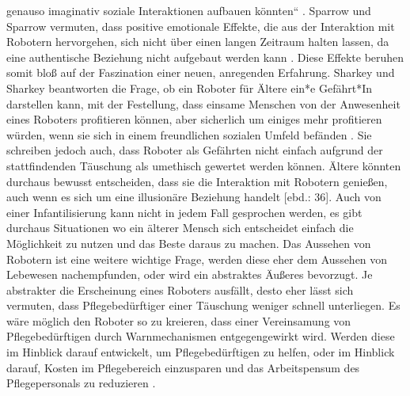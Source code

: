 genauso imaginativ soziale Interaktionen aufbauen könnten“ \cite[59]{haker}. Sparrow und Sparrow vermuten, dass positive emotionale Effekte, die aus der Interaktion mit Robotern hervorgehen, sich nicht über einen langen Zeitraum halten lassen, da eine authentische Beziehung nicht aufgebaut werden kann \cite[149]{sparrow}. Diese Effekte beruhen somit bloß auf der Faszination einer neuen, anregenden Erfahrung. Sharkey und Sharkey beantworten die Frage, ob ein Roboter für Ältere ein*e Gefährt*In darstellen kann, mit der Festellung, dass einsame Menschen von der Anwesenheit eines Roboters profitieren können, aber sicherlich um einiges mehr profitieren würden, wenn sie sich in einem freundlichen sozialen Umfeld befänden \cite[34]{sharky}. Sie schreiben jedoch auch, dass Roboter als Gefährten nicht einfach aufgrund der stattfindenden Täuschung als umethisch gewertet werden können. Ältere könnten durchaus bewusst entscheiden, dass sie die Interaktion mit Robotern genießen, auch wenn es sich um eine illusionäre Beziehung handelt [ebd.: 36]. Auch von einer Infantilisierung kann nicht in jedem Fall gesprochen werden, es gibt durchaus Situationen wo ein älterer Mensch sich entscheidet einfach die Möglichkeit zu nutzen und das Beste daraus zu machen.
Das Aussehen von Robotern ist eine weitere wichtige Frage, werden diese eher dem Aussehen von Lebewesen nachempfunden, oder wird ein abstraktes Äußeres bevorzugt. Je abstrakter die Erscheinung eines Roboters ausfällt, desto eher lässt sich vermuten, dass Pflegebedürftiger einer Täuschung weniger schnell unterliegen. Es wäre möglich den Roboter so zu kreieren, dass einer Vereinsamung von Pflegebedürftigen durch Warnmechanismen entgegengewirkt wird. Werden diese im Hinblick darauf entwickelt, um Pflegebedürftigen zu helfen, oder im Hinblick darauf, Kosten im Pflegebereich einzusparen und das Arbeitspensum des Pflegepersonals zu reduzieren \cite[30]{sharky}.

